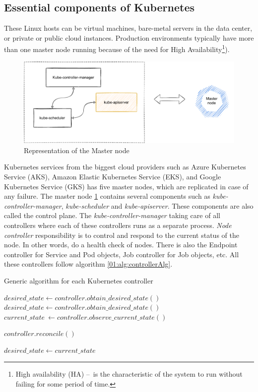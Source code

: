 \subsection{Essential components of Kubernetes}
These Linux hosts can be virtual machines, bare-metal servers in the data center, or private or public cloud instances. Production environments typically have more than one master node running because of the need for High Availability\footnote{High availability (HA) \---\ is the characteristic of the system to run without failing for some period of time.}). 
\begin{figure}[!h]
    \centering
    \includegraphics[scale=0.82]{obrazky-figures/02-preliminaries/01-kubernetes/02-architecture-master-sketch.pdf}
    \caption{Representation of the Master node}
    \label{02:fig:masterNode}
\end{figure}
Kubernetes services from the biggest cloud providers such as Azure Kubernetes Service (AKS), Amazon Elastic Kubernetes Service (EKS), and Google Kubernetes Service (GKS) has five master nodes, which are replicated in case of any failure. The master node \ref{02:fig:masterNode} contains several components such as \emph{kube-controller-manager}, \emph{kube-scheduler} and \emph{kube-apiserver}. These components are also called the control plane. The \emph{kube-controller-manager} taking care of all controllers where each of these controllers runs as a separate process. \emph{Node controller} responsibility is to control and respond to the current status of the node. In other words, do a health check of nodes. There is also the Endpoint controller for Service and Pod objects, Job controller for Job objects, etc. All these controllers follow algorithm \ref{01:alg:controllerAlg}.
\begin{algorithm}[H]
\label{01:alg:controllerAlg}
\caption{Generic algorithm for each Kubernetes controller}

    \begin{algorithmic}[1]
        \State $desired\_state \gets controller.obtain\_desired\_state()$
            \State $desired\_state \gets controller.obtain\_desired\_state()$
            \State $current\_state\ \gets controller.observe\_current\_state()$
            
                \State $controller.reconcile()$
            \EndIf
    
           \State $desired\_state \gets current\_state$
        \EndWhile
    \end{algorithmic}
\end{algorithm}
